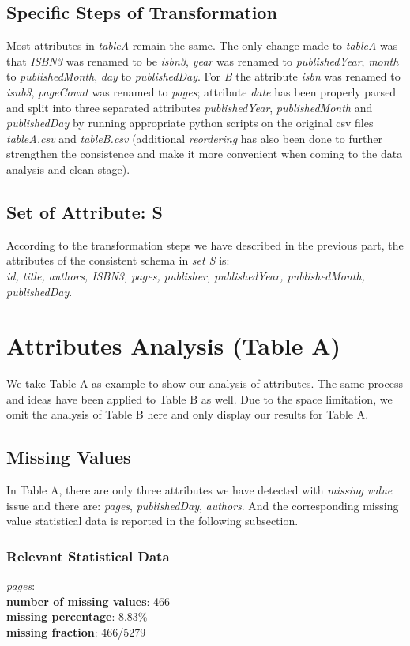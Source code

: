 \documentclass[10pt, oneside]{article}
\begin{document}
 \subsection*{Specific Steps of Transformation}
 Most attributes in \textit{tableA} remain the same. The only change made to \textit{tableA} was that \textit{ISBN3} was renamed to be \textit{isbn3},
 \textit{year} was renamed to \textit{publishedYear},  \textit{month} to \textit{publishedMonth}, \textit{day} to \textit{publishedDay}. For \textit{B}
 the attribute \textit{isbn} was renamed to \textit{isnb3}, \textit{pageCount} was renamed to \textit{pages}; attribute \textit{date} has been properly 
 parsed and split into three separated attributes \textit{publishedYear}, \textit{publishedMonth} and \textit{publishedDay} by running appropriate python scripts on the original csv files \textit{tableA.csv} 
 and \textit{tableB.csv} (additional \textit{reordering} has also been done to further strengthen the consistence and make it more convenient when coming to the data analysis and clean stage).
 
 \subsection*{Set of Attribute: S}
 According to the transformation steps we have described in the previous part, the attributes of the consistent schema in \textit{set S} is: \\
\textit{ id, title, authors, ISBN3, pages, publisher,  publishedYear, publishedMonth, publishedDay}.


\section*{Attributes Analysis (Table A)}
We take Table A as example to show our analysis of attributes. The same process and ideas have been applied to Table B as well. Due to the space limitation, we omit the analysis of 
Table B here and only display our results for Table A. 
\subsection*{Missing Values}
In Table A, there are only three attributes we have detected with \textit{missing value} issue and there are: \textit{pages}, \textit{publishedDay}, \textit{authors}. And the corresponding 
missing value statistical data is reported in the following subsection.

\subsubsection*{Relevant Statistical Data}
\textit{pages}:\\ 
\textbf{number of missing values}: 466\\ 
\textbf{missing percentage}: 8.83\%\\ 
\textbf{missing fraction}: 466/5279 
\end{document}
